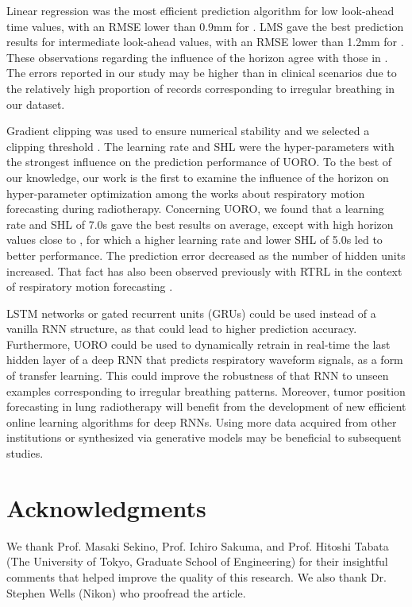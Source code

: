 \documentclass[twocolumn,a4paper]{svjour3} \sloppy          \smartqed
\begin{document}
Linear regression was the most efficient prediction algorithm for low look-ahead time values, with an RMSE lower than 0.9mm for . LMS gave the best prediction results for intermediate look-ahead values, with an RMSE lower than 1.2mm for . These observations regarding the influence of the horizon agree with those in \cite{verma2010survey}. The errors reported in our study may be higher than in clinical scenarios due to the relatively high proportion of records corresponding to irregular breathing in our dataset.

Gradient clipping was used to ensure numerical stability and we selected a clipping threshold . The learning rate and SHL were the hyper-parameters with the strongest influence on the prediction performance of UORO. To the best of our knowledge, our work is the first to examine the influence of the horizon on hyper-parameter optimization among the works about respiratory motion forecasting during radiotherapy. Concerning UORO, we found that a learning rate   and SHL of 7.0s gave the best results on average, except with high horizon values close to , for which a higher learning rate  and lower SHL of 5.0s led to better performance. The prediction error decreased as the number of hidden units increased. That fact has also been observed previously with RTRL in the context of respiratory motion forecasting \cite{POHL2021101941}. 

LSTM networks or gated recurrent units (GRUs) could be used instead of a vanilla RNN structure, as that could lead to higher prediction accuracy. Furthermore, UORO could be used to dynamically retrain in real-time the last hidden layer of a deep RNN that predicts respiratory waveform signals, as a form of transfer learning. This could improve the robustness of that RNN to unseen examples corresponding to irregular breathing patterns. Moreover, tumor position forecasting in lung radiotherapy will benefit from the development of new efficient online learning algorithms for deep RNNs. Using more data acquired from other institutions or synthesized via generative models \cite{pastor2021semi} may be beneficial to subsequent studies. 




\section*{Acknowledgments}

We thank Prof. Masaki Sekino, Prof. Ichiro Sakuma, and Prof. Hitoshi Tabata (The University of Tokyo, Graduate School of Engineering) for their insightful comments that helped improve the quality of this research. We also thank Dr. Stephen Wells (Nikon) who proofread the article. 
\end{document}
